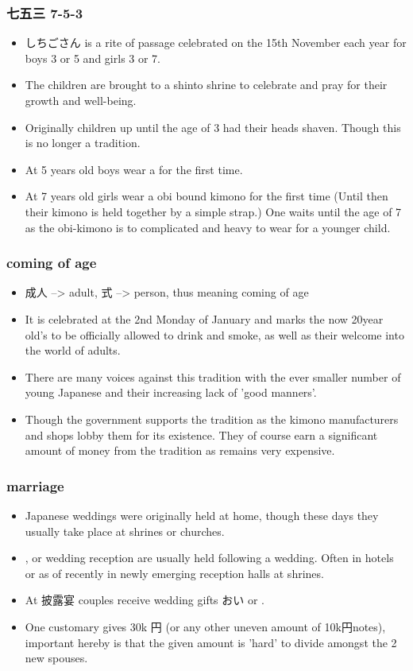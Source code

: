 \documentclass{article}
\newcommand\tabi[1][0.05cm]{\hspace*{#1}}
\begin{document}
\subsubsection{七五三 \tabi 7-5-3 }
\begin{itemize}
    \item しちごさん is a rite of passage celebrated on the 15th November each year for boys 3 or 5 and girls 3 or 7.
    \item The children are brought to a shinto shrine to celebrate and pray for their growth and well-being.
    \item Originally children up until the age of 3 had their heads shaven. Though this is no longer a tradition.
    \item At 5 years old boys wear a  for the first time.
    \item At 7 years old girls wear a obi bound kimono for the first time (Until then their kimono is held together by a simple strap.) One waits until the age of 7 as the obi-kimono is to complicated and heavy to wear for a younger child.
\end{itemize}
\subsubsection{ \tabi coming of age}
\begin{itemize}
    \item 成人 --> adult, 式 --> person, thus meaning coming of age
    \item It is celebrated at the 2nd Monday of January and marks the now 20year old's to be officially allowed to drink and smoke, as well as their welcome into the world of adults.
    \item There are many voices against this tradition with the ever smaller number of young Japanese and their increasing lack of 'good manners'.
    \item Though the government supports the tradition as the kimono manufacturers and shops lobby them for its existence. They of course earn a significant amount of money from the tradition as  remains very expensive.
\end{itemize}
\subsubsection{ \tabi marriage}
\begin{itemize}
    \item Japanese weddings were originally held at home, though these days they usually take place at shrines or churches.
    \item {}, or wedding reception are usually held following a wedding. Often in hotels or as of recently in newly emerging reception halls at shrines.
    \item At 披露宴 couples receive wedding gifts おい or .
    \item One customary gives 30k 円 (or any other uneven amount of 10k円notes), important hereby is that the given amount is 'hard' to divide amongst the 2 new spouses.
\end{itemize}
\end{document}
